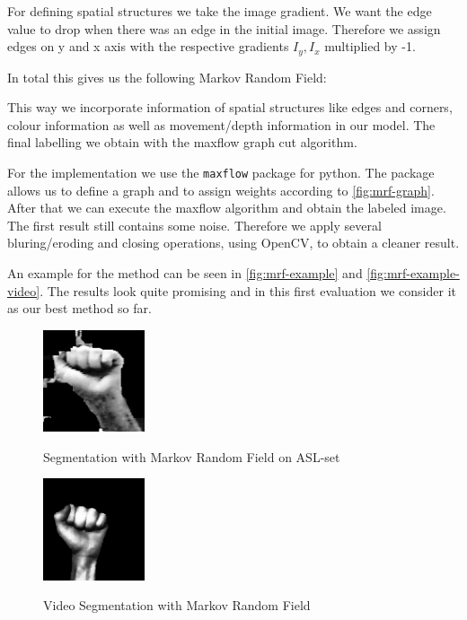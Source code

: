 \documentclass[letterpaper, 10 pt, conference]{ieeeconf}  %
\begin{document}
For defining spatial structures we take the image gradient. We want the edge value to drop when there was an edge in the initial image. Therefore we assign edges on y and x axis with the respective gradients $I_y, I_x$ multiplied by -1.

In total this gives us the following Markov Random Field:
\begin{center}

%

\end{center}

This way we incorporate information of spatial structures like edges and corners, colour information as well as movement/depth information in our model. The final labelling we obtain with the maxflow graph cut algorithm.

For the implementation we use the \texttt{maxflow} package for python. The package allows us to define a graph and to assign weights according to \autoref{fig:mrf-graph}. After that we can execute the maxflow algorithm and obtain the labeled image. The first result still contains some noise. Therefore we apply several bluring/eroding and closing operations, using OpenCV, to obtain a cleaner result.

An example for the method can be seen in \autoref{fig:mrf-example} and \autoref{fig:mrf-example-video}. The results look quite promising and in this first evaluation we consider it as our best method so far.

\begin{figure}
	\centering
	\begin{minipage}{0.4\linewidth}
		\centering
		\includegraphics[height=3cm]{mrf}
		\label{fig:mrf-example}
		\caption{Segmentation with Markov Random Field on ASL-set}
	\end{minipage}
	\hfill
	\begin{minipage}{0.4\linewidth}
		\centering
		\includegraphics[height=3cm]{mrf-video}
		\label{fig:mrf-example-video}
		\caption{Video Segmentation with Markov Random Field}
	\end{minipage}
\end{figure}
\end{document}
